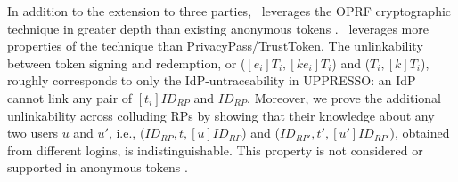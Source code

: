 



In addition to the extension to three parties,
    \usso\ leverages the OPRF cryptographic technique in greater depth than existing anonymous tokens \cite{privacypass,trusttoken}.
\usso\ leverages more properties of the technique than PrivacyPass/TrustToken.
The unlinkability between token signing and redemption, or ($[e_i]T_i, [ke_i]T_i$) and  ($T_i, [k]T_i$), roughly corresponds to only the IdP-untraceability in UPPRESSO: an IdP cannot link any pair of $[t_i]ID_{RP}$ and $ID_{RP}$.  %
Moreover,
    we prove the additional unlinkability across colluding RPs by showing that their knowledge about any two users $u$ and $u'$, i.e., ($ID_{RP}, t, [u]ID_{RP}$) and ($ID_{RP'}, t', [u']ID_{RP'}$), obtained from different logins, is indistinguishable.
This property is not considered or supported in anonymous tokens \cite{privacypass,trusttoken}.




